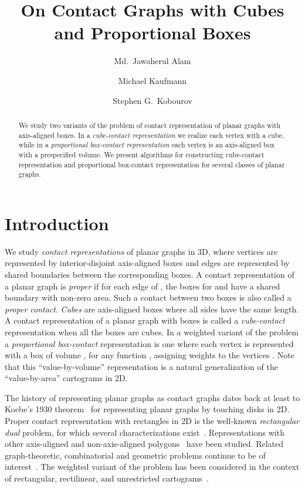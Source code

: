 \documentclass{llncs}
\title{On Contact Graphs with Cubes and Proportional Boxes}
\author
{
	Md.~Jawaherul Alam\inst{1} \and
	Michael Kaufmann\inst{2} \and
	Stephen G.~Kobourov\inst{1}
}
\institute{
	Department of Computer Science, University of Arizona, USA
\and
	Wilhelm-Schickhard-Institut f\"ur Informatik, Universit\"at T\"ubingen, Germany
}
\begin{document}
\date{}
\maketitle



\begin{abstract}
We study two variants of the problem of contact representation of planar graphs with
 axis-aligned boxes. In a \textit{cube-contact representation} we realize each
 vertex with a cube, while in a \textit{proportional box-contact representation} each
 vertex is an axis-aligned box with a prespecified volume. We present
 algorithms for constructing cube-contact representation and proportional box-contact
 representation for several classes of planar graphs.

\end{abstract}








\section{Introduction}

We study \textit{contact representations} of planar graphs in 3D, where vertices are
 represented by interior-disjoint axis-aligned boxes and edges are represented by shared
 boundaries between the corresponding boxes. A contact representation of a planar graph
  is \textit{proper} if for each edge  of , the boxes for  and  have a
 shared boundary with non-zero area. Such a contact between two boxes is also called a
 \textit{proper contact}. \textit{Cubes} are axis-aligned boxes where all sides have the same
 length. A contact representation of a planar graph with boxes is called a \textit{cube-contact}
 representation when all the boxes are cubes. In a weighted variant of
 the problem a \textit{proportional
 box-contact} representation is one where each vertex  is represented with
 a box of volume , for any function
 , assigning weights to the vertices .
 Note that this ``value-by-volume'' representation is a natural
 generalization of the ``value-by-area'' cartograms in 2D.





\smallskip{} The history of representing planar graphs as contact graphs dates back at least to
 Koebe's 1930 theorem~\cite{Koebe36} for representing planar graphs by touching disks
 in 2D. Proper contact representation with rectangles in 2D is the well-known {\em rectangular
 dual} problem, for which several characterizations exist~\cite{KK85,Ungar53}.
 Representations with other axis-aligned and non-axis-aligned
 polygons~\cite{FM94,GHKK10,YS93} have been studied. Related graph-theoretic, combinatorial
 and geometric problems continue to be of
 interest~\cite{BGPV08,Fusy09,EMSV12}. The weighted variant
 of the problem has been considered in the context of 
 rectangular, rectilinear, and unrestricted cartograms~\cite{BR11,EFK+13,KS07}.
\end{document}
